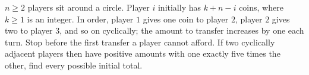 $n\ge2$ players sit around a circle. Player $i$ initially has $k+n-i$ coins, where $k\ge1$ is an integer. In order, player $1$ gives one coin to player $2$, player $2$ gives two to player $3$, and so on cyclically; the amount to transfer increases by one each turn. Stop before the first transfer a player cannot afford. If two cyclically adjacent players then have positive amounts with one exactly five times the other, find every possible initial total.
